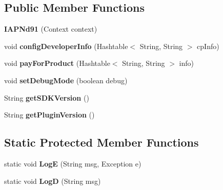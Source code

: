 \subsection*{Public Member Functions}
\begin{DoxyCompactItemize}
\item 
\mbox{\label{classorg_1_1cocos2dx_1_1plugin_1_1IAPNd91_a46b7a94eb583fcc8fb1580ab720694f1}} 
{\bfseries I\+A\+P\+Nd91} (Context context)
\item 
\mbox{\label{classorg_1_1cocos2dx_1_1plugin_1_1IAPNd91_a8ebfc520757c640f0e5975dd6cb69b00}} 
void {\bfseries config\+Developer\+Info} (Hashtable$<$ String, String $>$ cp\+Info)
\item 
\mbox{\label{classorg_1_1cocos2dx_1_1plugin_1_1IAPNd91_a24e72e05a587fb9a3c7d5866e41c184b}} 
void {\bfseries pay\+For\+Product} (Hashtable$<$ String, String $>$ info)
\item 
\mbox{\label{classorg_1_1cocos2dx_1_1plugin_1_1IAPNd91_a9b3ab8adf25ef3c2bf7b45910eed25b2}} 
void {\bfseries set\+Debug\+Mode} (boolean debug)
\item 
\mbox{\label{classorg_1_1cocos2dx_1_1plugin_1_1IAPNd91_a92098a04086016430eae6bfafc33b6c0}} 
String {\bfseries get\+S\+D\+K\+Version} ()
\item 
\mbox{\label{classorg_1_1cocos2dx_1_1plugin_1_1IAPNd91_a52cc1f2300b7fd31d448bf64b6fe2f8c}} 
String {\bfseries get\+Plugin\+Version} ()
\end{DoxyCompactItemize}
\subsection*{Static Protected Member Functions}
\begin{DoxyCompactItemize}
\item 
\mbox{\label{classorg_1_1cocos2dx_1_1plugin_1_1IAPNd91_aedcf9a2489159886ee2424e7cbba201c}} 
static void {\bfseries LogE} (String msg, Exception e)
\item 
\mbox{\label{classorg_1_1cocos2dx_1_1plugin_1_1IAPNd91_a35c84ce19a51ef1f6bbc0816a034ef11}} 
static void {\bfseries LogD} (String msg)
\end{DoxyCompactItemize}
